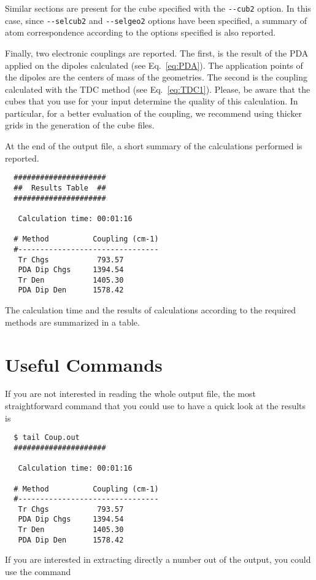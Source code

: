 \documentclass[a4paper]{article}
\begin{document}
Similar sections are present for the cube specified with the \verb|--cub2| option. In this case, since \verb|--selcub2| and \verb|--selgeo2| options have been specified, a summary of atom correspondence according to the options specified is also reported.

Finally, two electronic couplings are reported. The first, is the result of the PDA applied on the dipoles calculated (see Eq.~\ref{eq:PDA}). The application points of the dipoles are the centers of mass of the geometries. The second is the coupling calculated with the TDC method (see Eq.~\ref{eq:TDC1}).
Please, be aware that the cubes that you use for your input determine the quality of this calculation. In particular, for a better evaluation of the coupling, we recommend using thicker grids in the generation of the cube files.

At the end of the output file, a short summary of the calculations performed is reported.

\begin{verbatim}
  #####################
  ##  Results Table  ##
  #####################
  
   Calculation time: 00:01:16
  
  # Method          Coupling (cm-1)
  #--------------------------------
   Tr Chgs           793.57 
   PDA Dip Chgs     1394.54 
   Tr Den           1405.30 
   PDA Dip Den      1578.42 
\end{verbatim}

The calculation time and the results of calculations according to the required methods are summarized in a table.

\section*{Useful Commands}
If you are not interested in reading the whole output file, the most straightforward command that you could use to have a quick look at the results is

\begin{verbatim}
  $ tail Coup.out
  #####################

   Calculation time: 00:01:16
  
  # Method          Coupling (cm-1)
  #--------------------------------
   Tr Chgs           793.57 
   PDA Dip Chgs     1394.54 
   Tr Den           1405.30 
   PDA Dip Den      1578.42  
\end{verbatim}

If you are interested in extracting directly a number out of the output, you could use the command
\end{document}
